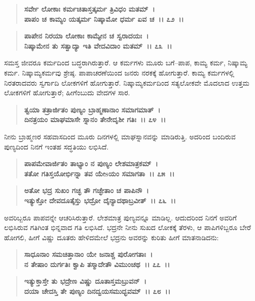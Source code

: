 \begin{verse}
\textbf{ಸರ್ವೇ ಲೋಕಾಃ ಕರ್ಮಚಿತಾಸ್ತತ್ಕರ್ಮ ತ್ರಿವಿಧಂ ಮತಮ್~।}\\\textbf{ಪಾಪಂ ಚ ಕಾಮ್ಯಂ ಯತ್ಕರ್ಮ ನಿಷ್ಕಾಮೋ ಧರ್ಮ ಏವ ಚ~।। ೭೨~।।} 
\end{verse}

\begin{verse}
\textbf{ಪಾಪೇನ ನಿರಯಾ ಲೋಕಾಃ ಕಾಮ್ಯೇನ ಚ ಸ್ವರಾದಯಃ~।}\\\textbf{ನಿಷ್ಕಾಮೇನ ತು ಸತ್ವಾದ್ಯಾ ಇತಿ ವೇದವಿದಾಂ ಮತಮ್~।। ೭೩~।।}
\end{verse}

ಸಮಸ್ತ ಜೀವರೂ ಕರ್ಮದಿಂದ ಬದ್ಧರಾಗಿರುತ್ತಾರೆ. ಆ ಕರ್ಮಗಳು ಮೂರು ಬಗೆ–ಪಾಪ, ಕಾಮ್ಯ ಕರ್ಮ, ನಿಷ್ಕಾಮ್ಯ ಕರ್ಮ. ನಿಷ್ಕಾಮ್ಯಕರ್ಮವು ಶ್ರೇಷ್ಠ. ಪಾಪಾಚರಣೆಯಿಂದ ಜನರು ನರಕಕ್ಕೆ ಹೋಗುತ್ತಾರೆ. ಕಾಮ್ಯ ಕರ್ಮಗಳಲ್ಲಿ ನಿರತರಾದವರು ಸ್ವರ್ಗಾದಿ ಲೋಕಗಳಿಗೆ ಹೋಗುತ್ತಾರೆ. ನಿಷ್ಕಾಮ್ಯಕರ್ಮದಿಂದ ಸತ್ಯಲೋಕವೇ ಮೊದಲಾದ ಉತ್ತಮ ಲೋಕಗಳಿಗೆ ಹೋಗುತ್ತಾರೆ; ಹೀಗೆಂಬುದು ವೇದಗಳ ಸಾರ.

\begin{verse}
\textbf{ತ್ವಯಾ ತತ್ರಾರ್ಜಿತಂ ಪುಣ್ಯಂ ಬ್ರಾಹ್ಮಣಾನಾಂ ಸಮಾಗಮಾತ್~।}\\\textbf{ದಿನತ್ರಯಂ ಮಾಘಮಾಸೇ ಸ್ನಾನಂ ತೇನೇದೃಶೀ ಗತಿಃ~।। ೭೪~।।}
\end{verse}

ನೀನು ಬ್ರಾಹ್ಮಣರ ಸಹವಾಸದಿಂದ ಮೂರು ದಿನಗಳಲ್ಲಿ ಮಾಘಸ್ನಾನವನ್ನು ಮಾಡಿರುತ್ತಿ. ಅದರಿಂದ ಬಂದಿರುವ ಪುಣ್ಯದಿಂದ ನಿನಗೆ ಇಂತಹ ಸದ್ಧತಿಯು ಲಭಿಸಿದೆ.

\begin{verse}
\textbf{ಪಾಪಮೇವಾರ್ಜಿತಂ ತಾಭ್ಯಾಂ ನ ಪುಣ್ಯಂ ಲೇಶಮಾತ್ರಕಮ್~।}\\\textbf{ತತೋ ಗತಿಸ್ತಯೋರ್ಭಿನ್ನಾ ತವ ಯೇsಯಂ ಸಮಾಗತಾ~।। ೭೫~।। }
\end{verse}

\begin{verse}
\textbf{ಅತೋ ಭದ್ರ ಸುಖಂ ಗಚ್ಛ ತೌ ಗಚ್ಛೇತಾಂ ಚ ಪಾಪಿನೌ~।}\\\textbf{ಇತ್ಯುಕ್ತೋ ದೇವದೂತೈಸ್ತು ಭದ್ರೋ ದೈನ್ಯಾದಥಾಬ್ರವೀತ್~।। ೭೬~।।}
\end{verse}

ಅವರಿಬ್ಬರೂ ಪಾಪವನ್ನೇ ಆಚರಿಸಿರುತ್ತಾರೆ. ಲೇಶಮಾತ್ರ ಪುಣ್ಯವನ್ನೂ ಮಾಡಿಲ್ಲ. ಆದುದರಿಂದ ನಿನಗೆ ಅವರಿಗೆ ಲಭಿಸಿರುವ ಗತಿಗಿಂತ ಭಿನ್ನವಾದ ಗತಿ ಲಭಿಸಿದೆ. ಭದ್ರನೇ ನೀನು ಸುಖದ ಲೋಕಕ್ಕೆ ತೆರಳು, ಆ ಪಾಪಿಗಳಿಬ್ಬರೂ ಬೇರೆ ಹೋಗಲಿ, ಹೀಗೆ ವಿಷ್ಣು ದೂತರು ಹೇಳಿದಮೇಲೆ ಭದ್ರನು ಅವರನ್ನು ಕುರಿತು ಹೀಗೆ ಮಾತನಾಡಿದನು:

\begin{verse}
\textbf{ಸಾಧೂನಾಂ ಸಮಚಿತ್ತಾನಾಂ ಯೇ ಜನಾಶ್ಚ ಪುರೋಗತಾಃ~।}\\\textbf{ನ ತೇಷಾಂ ದುರ್ಗತಿಃ ಕ್ವಾಪಿ ತಸ್ಮಾದೇತೌ ವಿಮುಂಚಥ~।। ೭೭~।।} 
\end{verse}

\begin{verse}
\textbf{ಇತ್ಯುಕ್ತಾಸ್ತೇ ತು ಭದ್ರೇಣ ವಿಷ್ಣು ದೂತಾಸ್ತಮಬ್ರುವನ್~।}\\\textbf{ದಯಾ ಚೇದಸ್ತಿ ತೇ ಪುಣ್ಯಂ ದಿನದ್ವಯಸಮುದ್ಭವಮ್~।। ೭೮~।। }
\end{verse}

